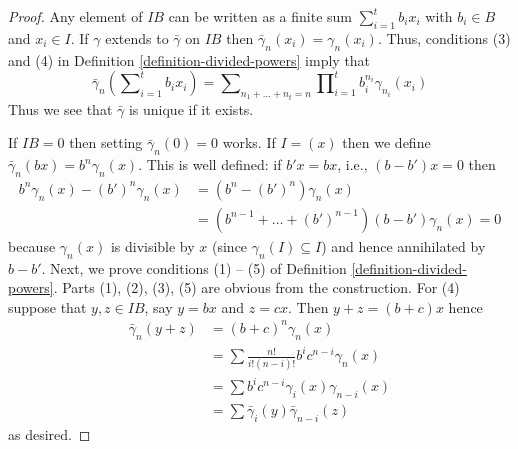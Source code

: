 \begin{proof}
Any element of $IB$ can be written as a finite sum
$\sum\nolimits_{i=1}^t b_ix_i$ with
$b_i \in B$ and $x_i \in I$. If $\gamma$ extends to $\bar\gamma$ on $IB$
then $\bar\gamma_n(x_i) = \gamma_n(x_i)$.
Thus, conditions (3) and (4) in
Definition \ref{definition-divided-powers} imply that
$$
\bar\gamma_n(\sum\nolimits_{i=1}^t b_ix_i) =
\sum\nolimits_{n_1 + \ldots + n_t = n}
\prod\nolimits_{i = 1}^t b_i^{n_i}\gamma_{n_i}(x_i)
$$
Thus we see that $\bar\gamma$ is unique if it exists.

\medskip\noindent
If $IB = 0$ then setting $\bar\gamma_n(0) = 0$ works. If $I = (x)$
then we define $\bar\gamma_n(bx) = b^n\gamma_n(x)$. This is well defined:
if $b'x = bx$, i.e., $(b - b')x = 0$ then
\begin{align*}
b^n\gamma_n(x) - (b')^n\gamma_n(x)
& =
(b^n - (b')^n)\gamma_n(x) \\
& =
(b^{n - 1} + \ldots + (b')^{n - 1})(b - b')\gamma_n(x) = 0
\end{align*}
because $\gamma_n(x)$ is divisible by $x$ (since
$\gamma_n(I) \subseteq I$) and hence annihilated by $b - b'$.
Next, we prove conditions (1) -- (5) of
Definition \ref{definition-divided-powers}.
Parts (1), (2), (3), (5) are obvious from the construction.
For (4) suppose that $y, z \in IB$, say $y = bx$ and $z = cx$. Then
$y + z = (b + c)x$ hence
\begin{align*}
\bar\gamma_n(y + z)
& =
(b + c)^n\gamma_n(x) \\
& =
\sum \frac{n!}{i!(n - i)!}b^ic^{n -i}\gamma_n(x) \\
& =
\sum b^ic^{n - i}\gamma_i(x)\gamma_{n - i}(x) \\
& =
\sum \bar\gamma_i(y)\bar\gamma_{n -i}(z)
\end{align*}
as desired.


\end{proof}
